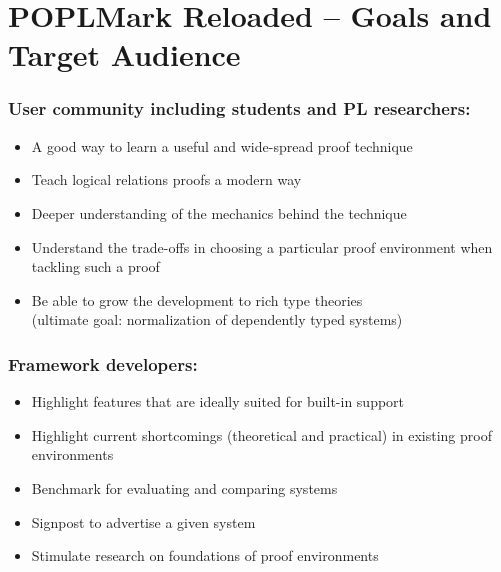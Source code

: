 \documentclass{beamer}
\begin{document}

\section{POPLMark Reloaded -- \newline Goals and Target Audience}
\begin{frame}\frametitle{User community including students and PL researchers:}%
\vspace{-3cm}


  \begin{itemize}
  \item A good way to learn a useful and wide-spread proof technique
  \item Teach logical relations proofs a modern way 
  \item Deeper understanding of the mechanics behind the technique
  \item Understand the trade-offs in choosing a particular proof
    environment when tackling such a proof
  \item Be able to grow the development to rich type theories \\
(ultimate goal: normalization of dependently typed systems)
  \end{itemize}





\end{frame}


\begin{frame}\frametitle{Framework developers:}%
\vspace{-3cm}
\begin{itemize}
\item Highlight features that are ideally suited for built-in support
\item Highlight current shortcomings (theoretical and practical) in existing proof environments
\item Benchmark for evaluating and comparing systems
\item Signpost to advertise a given system
\item Stimulate research on foundations of proof environments
\end{itemize}




\end{frame}
\end{document}
